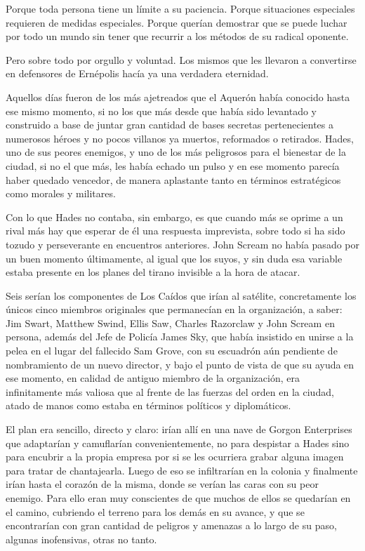 Porque toda persona tiene un límite a su paciencia. Porque situaciones especiales requieren de medidas especiales. Porque querían demostrar que se puede luchar por todo un mundo sin tener que recurrir a los métodos de su radical oponente.

Pero sobre todo por orgullo y voluntad. Los mismos que les llevaron a convertirse en defensores de Ernépolis hacía ya una verdadera eternidad.

\fancyparbreak
Aquellos días fueron de los más ajetreados que el Aquerón había conocido hasta ese mismo momento, si no los que más desde que había sido levantado y construido a base de juntar gran cantidad de bases secretas pertenecientes a numerosos héroes y no pocos villanos ya muertos, reformados o retirados. Hades, uno de sus peores enemigos, y uno de los más peligrosos para el bienestar de la ciudad, si no el que más, les había echado un pulso y en ese momento parecía haber quedado vencedor, de manera aplastante tanto en términos estratégicos como morales y militares.

Con lo que Hades no contaba, sin embargo, es que cuando más se oprime a un rival más hay que esperar de él una respuesta imprevista, sobre todo si ha sido tozudo y perseverante en encuentros anteriores. John Scream no había pasado por un buen momento últimamente, al igual que los suyos, y sin duda esa variable estaba presente en los planes del tirano invisible a la hora de atacar.

Seis serían los componentes de Los Caídos que irían al satélite, concretamente los únicos cinco miembros originales que permanecían en la organización, a saber: Jim Swart, Matthew Swind, Ellis Saw, Charles Razorclaw y John Scream en persona, además del Jefe de Policía James Sky, que había insistido en unirse a la pelea en el lugar del fallecido Sam Grove, con su escuadrón aún pendiente de nombramiento de un nuevo director, y bajo el punto de vista de que su ayuda en ese momento, en calidad de antiguo miembro de la organización, era infinitamente más valiosa que al frente de las fuerzas del orden en la ciudad, atado de manos como estaba en términos políticos y diplomáticos.

El plan era sencillo, directo y claro: irían allí en una nave de Gorgon Enterprises que adaptarían y camuflarían convenientemente, no para despistar a Hades sino para encubrir a la propia empresa por si se les ocurriera grabar alguna imagen para tratar de chantajearla. Luego de eso se infiltrarían en la colonia y finalmente irían hasta el corazón de la misma, donde se verían las caras con su peor enemigo. Para ello eran muy conscientes de que muchos de ellos se quedarían en el camino, cubriendo el terreno para los demás en su avance, y que se encontrarían con gran cantidad de peligros y amenazas a lo largo de su paso, algunas inofensivas, otras no tanto.

